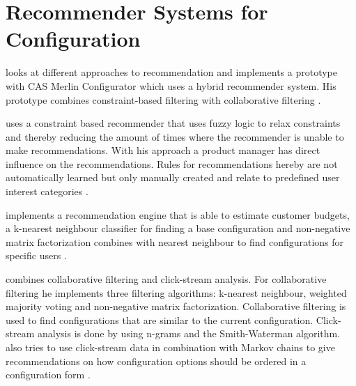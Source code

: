 \section{Recommender Systems for Configuration}
\label{sec:Related_Work:RecommenderSystemsForGonfiguration}
\begin{description}[style=unboxed, leftmargin=0cm, font=\normalfont]
    \item[\citeauthor{rubinshteynEntwicklungHybridenRecommender2018}] looks at different approaches to recommendation and implements a prototype with CAS Merlin Configurator which uses a hybrid recommender system. His prototype combines constraint-based filtering with collaborative filtering \cite{rubinshteynEntwicklungHybridenRecommender2018}.

    \item [\citeauthor{benzMoeglichkeitenIntelligenterEmpfehlungssysteme2017}] uses a constraint based recommender that uses fuzzy logic to relax constraints and thereby reducing the amount of times where the recommender is unable to make recommendations. With his approach a product manager has direct influence on the recommendations. Rules for recommendations hereby are not automatically learned but only manually created and relate to predefined user interest categories \cite{benzMoeglichkeitenIntelligenterEmpfehlungssysteme2017}.

    \item [\citeauthor{ullmannEntwurfUndUmsetzung2017}] implements a recommendation engine that is able to estimate customer budgets, a k-nearest neighbour classifier for finding a base configuration and non-negative matrix factorization combines with nearest neighbour to find configurations for specific users \cite{ullmannEntwurfUndUmsetzung2017}. \par

    \item[\citeauthor{wetzelPersonalisierterUndLernender2017}] combines collaborative filtering and click-stream analysis. For collaborative filtering he implements three filtering algorithms: k-nearest neighbour, weighted majority voting and non-negative matrix factorization. Collaborative filtering is used to find configurations that are similar to the current configuration. Click-stream analysis is done by using n-grams and the Smith-Waterman algorithm. \citeauthor{wetzelPersonalisierterUndLernender2017} also tries to use click-stream data in combination with Markov chains to give recommendations on how configuration options should be ordered in a configuration form \cite{wetzelPersonalisierterUndLernender2017}.
\end{description}


